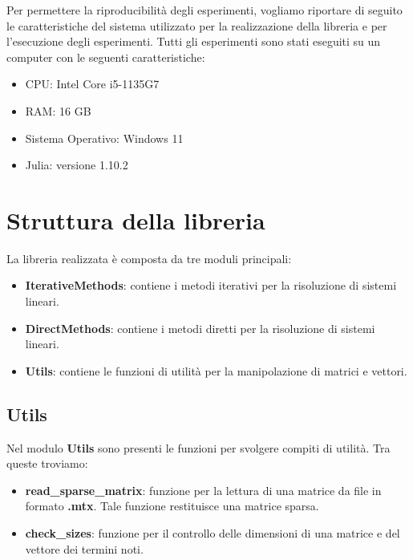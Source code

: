Per permettere la riproducibilità degli esperimenti, vogliamo riportare di seguito
le caratteristiche del sistema utilizzato per la realizzazione della libreria e
per l'esecuzione degli esperimenti. Tutti gli esperimenti sono stati eseguiti su
un computer con le seguenti caratteristiche:
\begin{itemize}
    \item CPU: Intel Core i5-1135G7
    \item RAM: 16 GB
    \item Sistema Operativo: Windows 11
    \item Julia: versione 1.10.2
\end{itemize}
\section{Struttura della libreria}
La libreria realizzata è composta da tre moduli principali:
\begin{itemize}
    \item \textbf{IterativeMethods}: contiene i metodi iterativi per la risoluzione
          di sistemi lineari.
    \item \textbf{DirectMethods}: contiene i metodi diretti per la risoluzione
          di sistemi lineari.
    \item \textbf{Utils}: contiene le funzioni di utilità per la manipolazione
          di matrici e vettori.
\end{itemize}

\subsection{Utils}
Nel modulo \textbf{Utils} sono presenti le funzioni per svolgere compiti di
utilità. Tra queste troviamo:
\begin{itemize}
    \item \textbf{read\_sparse\_matrix}: funzione per la lettura di una matrice
          da file in formato \textbf{.mtx}. Tale funzione restituisce una matrice
          sparsa.
    \item \textbf{check\_sizes}: funzione per il controllo delle dimensioni di
          una matrice e del vettore dei termini noti.
\end{itemize}
